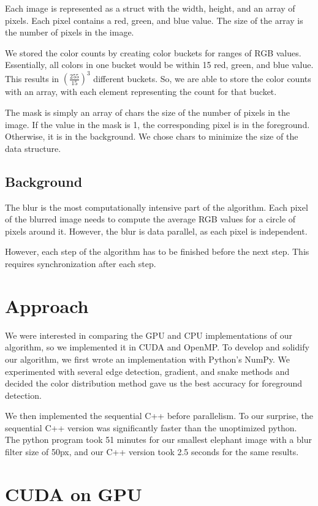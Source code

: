 \documentclass[12pt]{article}
\begin{document}
Each image is represented as a struct with the width, height, and an array of
pixels. Each pixel contains a red, green, and blue value. The size of the array
is the number of pixels in the image.

We stored the color counts by creating color buckets for ranges of RGB values.
Essentially, all colors in one bucket would be within 15 red, green, and blue
value. This results in $\left(\tfrac{255}{15}\right)^3$ different buckets. So,
we are able to store the color counts with an array, with each element
representing the count for that bucket.

The mask is simply an array of chars the size of the number of pixels in the
image. If the value in the mask is 1, the corresponding pixel is in the
foreground. Otherwise, it is in the background. We chose chars to minimize the
size of the data structure.

\subsection{Background}

The blur is the most computationally intensive part of the algorithm. Each
pixel of the blurred image needs to compute the average RGB values for a circle
of pixels around it. However, the blur is data parallel, as each pixel is
independent.

However, each step of the algorithm has to be finished before the next step.
This requires synchronization after each step.

\section{Approach}

We were interested in comparing the GPU and CPU implementations of our
algorithm, so we implemented it in CUDA and OpenMP. To develop and solidify our
algorithm, we first wrote an implementation with Python's NumPy. We
experimented with several edge detection, gradient, and snake methods and
decided the color distribution method gave us the best accuracy for foreground
detection.

We then implemented the sequential C++ before parallelism. To our surprise, the
sequential C++ version was significantly faster than the unoptimized python.
The python program took 51 minutes for our smallest elephant image with a blur
filter size of 50px, and our C++ version took 2.5 seconds for the same results.

\section{CUDA on GPU}
\end{document}
